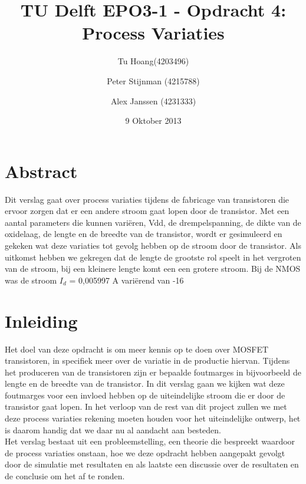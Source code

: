 \documentclass{article}
\author{
Tu Hoang(4203496) \and Peter Stijnman (4215788) \and Alex Janssen (4231333) \\
}
\title{TU Delft EPO3-1 - Opdracht 4: Process Variaties}
\date{9 Oktober 2013}
\begin{document}
\maketitle

\section{Abstract}

Dit verslag gaat over process variaties tijdens de fabricage van transistoren die ervoor zorgen dat er een andere stroom gaat lopen door de transistor. Met een aantal parameters die kunnen variëren, Vdd, de drempelspanning, de dikte van de oxidelaag, de lengte en de breedte van de transistor, wordt er gesimuleerd en gekeken wat deze variaties tot gevolg hebben op de stroom door de transistor. Als uitkomst hebben we gekregen dat de lengte de grootste rol speelt in het vergroten van de stroom, bij een kleinere lengte komt een een grotere stroom.
Bij de NMOS was de stroom $I_d$ =  0,005997 A variërend van -16%

\tableofcontents
\clearpage

\section{Inleiding}
Het doel van deze opdracht is om meer kennis op te doen over MOSFET transistoren, in specifiek meer over de variatie in de productie hiervan. Tijdens het produceren van de transistoren zijn er bepaalde foutmarges in bijvoorbeeld de lengte en de breedte van de transistor. In dit verslag gaan we kijken wat deze foutmarges voor een invloed hebben op de uiteindelijke stroom die er door de transistor gaat lopen. In het verloop van de rest van dit project zullen we met deze process variaties rekening moeten houden voor het uiteindelijke ontwerp, het is daarom handig dat we daar nu al aandacht aan besteden.\\
Het verslag bestaat uit een probleemstelling, een theorie die bespreekt waardoor de process variaties onstaan, hoe we deze opdracht hebben aangepakt gevolgt door de simulatie met resultaten en als laatste een discussie over de resultaten en de conclusie om het af te ronden.
\end{document}
